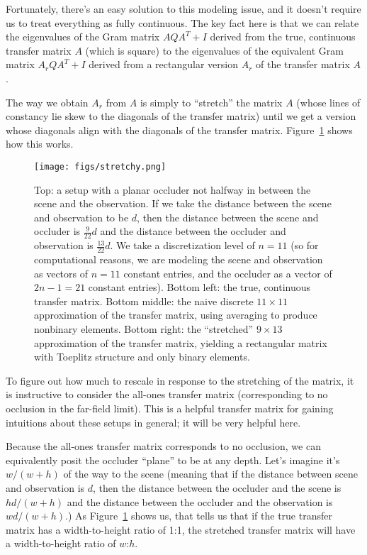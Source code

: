 Fortunately, there's an easy solution to this modeling issue, and it doesn't require us to treat everything as fully continuous. The key fact here is that we can relate the eigenvalues of the Gram matrix $A Q A^T + I$ derived from the true, continuous transfer matrix $A$ (which is square) to the eigenvalues of the equivalent Gram matrix $A_r Q A^T + I$ derived from a rectangular version $A_r$ of the transfer matrix $A$. 

The way we obtain $A_r$ from $A$ is simply to ``stretch'' the matrix $A$ (whose lines of constancy lie skew to the diagonals of the transfer matrix) until we get a version whose diagonals align with the diagonals of the transfer matrix. Figure~\ref{fig:stretchy} shows how this works.

\begin{figure}
\begin{center}
\texttt{[image: figs/stretchy.png]}
\caption{Top: a setup with a planar occluder not halfway in between the scene and the observation. If we take the distance between the scene and observation to be $d$, then the distance between the scene and occluder is $\frac{9}{22}d$ and the distance between the occluder and observation is $\frac{13}{22}d$. We take a discretization level of $n=11$ (so for computational reasons, we are modeling the scene and observation as vectors of $n=11$ constant entries, and the occluder as a vector of $2n-1 = 21$ constant entries). Bottom left: the true, continuous transfer matrix. Bottom middle: the naive discrete $11 \times 11$ approximation of the transfer matrix, using averaging to produce nonbinary elements. Bottom right: the ``stretched'' $9 \times 13$ approximation of the transfer matrix, yielding a rectangular matrix with Toeplitz structure and only binary elements. \label{fig:stretchy}}
\end{center}
\end{figure}

To figure out how much to rescale in response to the stretching of the matrix, it is instructive to consider the all-ones transfer matrix (corresponding to no occlusion in the far-field limit). This is a helpful transfer matrix for gaining intuitions about these setups in general; it will be very helpful here.

Because the all-ones transfer matrix corresponds to no occlusion, we can equivalently posit the occluder ``plane'' to be at any depth. Let's imagine it's $w/(w+h)$ of the way to the scene (meaning that if the distance between scene and observation is $d$, then the distance between the occluder and the scene is $hd/(w+h)$ and the distance between the occluder and the observation is $wd/(w+h)$.) As Figure~\ref{fig:stretchy} shows us, that tells us that if the true transfer matrix has a width-to-height ratio of 1:1, the stretched transfer matrix will have a width-to-height ratio of $w$:$h$. 

